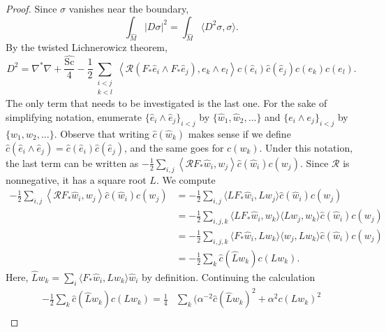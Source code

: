 \documentclass[12pt, reqno]{amsart}
\theoremstyle{plain} %
\theoremstyle{definition}
\theoremstyle{remark}
\numberwithin{equation}{section}
\newcommand{\dom}[1]{\hat{#1}}
\newcommand{\pnorm}[1]{| #1 |}
\newcommand{\Sc}{\mathrm{Sc}}
\begin{document}
\begin{proof}
    Since \(\sigma\) vanishes near the boundary,
    \begin{equation*}
        \int_{\dom{M}}\pnorm{D\sigma}^2=\int_{\dom{M}}\langle D^2\sigma,\sigma\rangle.
    \end{equation*}
    By the twisted Lichnerowicz theorem,
    \begin{equation*}
        D^2=\nabla^*\nabla+\frac{\dom{\Sc}}{4}-\frac{1}{2}\sum_{ \substack{i<j \\ k<l} }\left<\mathcal{R}(F_*\dom{e}_i\wedge F_*\dom{e}_j),e_k\wedge e_l\right>\dom{c}(\dom{e}_i)\dom{c}(\dom{e}_j)c(e_k)c(e_l).
    \end{equation*}
    The only term that needs to be investigated is the last one.
    For the sake of simplifying notation, enumerate \(\{\dom{e}_i\wedge\dom{e}_j\}_{i<j}\) by \(\{ \dom{w}_1,\dom{w}_2,\ldots\}\) and \(\{e_i\wedge e_j\}_{i<j}\) by \(\{w_1,w_2,\ldots\}\).
    Observe that writing \(\dom{c}(\dom{w}_k)\) makes sense if we define \(\dom{c}(\dom{e}_i\wedge\dom{e}_j)=\dom{c}(\dom{e}_i)\dom{c}(\dom{e}_j)\), and the same goes for \(c(w_k)\).
    Under this notation, the last term can be written as \(-\frac{1}{2}\sum_{i,j}\left<\mathcal{R}F_*\dom{w}_i,w_j\right>\dom{c}(\dom{w}_i)c(w_j)\).
    Since \(\mathcal{R}\) is nonnegative, it has a square root \(L\).
    We compute
    \begin{equation*}
        \begin{aligned}
            -\frac{1}{2}\sum_{i,j}\left<\mathcal{R}F_*\dom{w}_i,w_j\right>\dom{c}(\dom{w}_i)c(w_j)&=-\frac{1}{2}\sum_{i,j}\langle LF_*\dom{w}_i,Lw_j\rangle\dom{c}(\dom{w}_i)c(w_j)\\
            &=-\frac{1}{2}\sum_{i,j,k}\langle LF_*\dom{w}_i,w_k\rangle\langle Lw_j,w_k\rangle\dom{c}(\dom{w}_i)c(w_j)\\
            &=-\frac{1}{2}\sum_{i,j,k}\langle F_*\dom{w}_i,Lw_k\rangle\langle w_j,Lw_k\rangle\dom{c}(\dom{w}_i)c(w_j)\\
            &=-\frac{1}{2}\sum_k\dom{c}(\dom{L}w_k)c(Lw_k).
        \end{aligned}
    \end{equation*}
    Here, \(\dom{L}w_k= \sum_i \langle F_*\dom{w}_i,Lw_k\rangle \dom{w}_i\) by definition.
    Continuing the calculation
    \begin{equation*}
        \begin{aligned}
            -\frac{1}{2}\sum_k\dom{c}(\dom{L}w_k)c(Lw_k)=\frac{1}{4}&\sum_k\Big(\alpha^{-2}\dom{c}(\dom{L}w_k)^2+\alpha^2c(Lw_k)^2 \\

\end{aligned}
\end{equation*}
\end{proof}
\end{document}
